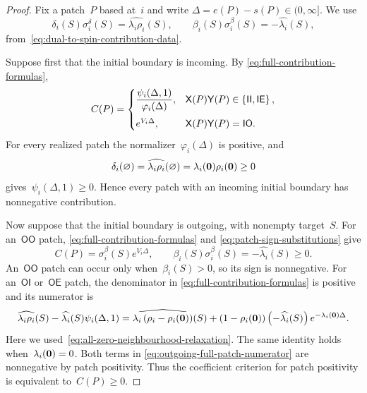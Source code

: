 \documentclass[EJP,preprint,NODS,nobera]{ejpecp}
\begin{document}
\begin{proof}
Fix a patch~$P$ based at~$i$ and write
$\Delta=e(P)-s(P)\in(0,\infty]$. We use
\begin{equation}
\label{eq:patch-sign-substitutions}
\delta_i(S)\sigma_i^\delta(S)
=
\widehat{\lambda_i\rho_i}(S),
\qquad
\beta_i(S)\sigma_i^\beta(S)
=
-\widehat{\lambda_i}(S),
\end{equation}
from~\eqref{eq:dual-to-spin-contribution-data}.

Suppose first that the initial boundary is incoming. By
\eqref{eq:full-contribution-formulas},
\begin{equation*}
C(P)
=
\begin{cases}
\displaystyle
\frac{\psi_i(\Delta,1)}{\varphi_i(\Delta)},
&\mathsf X(P)\mathsf Y(P)\in\left\{\mathsf{II},\mathsf{IE}\right\},
\\[1em]
e^{V_i\Delta},
&\mathsf X(P)\mathsf Y(P)=\mathsf{IO}.
\end{cases}
\end{equation*}
For every realized patch the normalizer~$\varphi_i(\Delta)$ is positive, and
\begin{equation*}
\delta_i(\varnothing)
=
\widehat{\lambda_i\rho_i}(\varnothing)
=
\lambda_i(\mathbf{0})\rho_i(\mathbf{0})
\geq0
\end{equation*}
gives~$\psi_i(\Delta,1)\geq0$. Hence every patch with an incoming
initial boundary has nonnegative contribution.

Now suppose that the initial boundary is outgoing, with nonempty target~$S$.
For an~$\mathsf{OO}$ patch,
\eqref{eq:full-contribution-formulas} and
\eqref{eq:patch-sign-substitutions} give
\begin{equation*}
C(P)
=
\sigma_i^\beta(S)e^{V_i\Delta},
\qquad
\beta_i(S)\sigma_i^\beta(S)
=
-\widehat{\lambda_i}(S)
\geq0.
\end{equation*}
An~$\mathsf{OO}$ patch can occur only when~$\beta_i(S)>0$, so its sign is
nonnegative. For an~$\mathsf{OI}$ or~$\mathsf{OE}$ patch, the denominator in
\eqref{eq:full-contribution-formulas} is positive and its numerator is
\begin{equation}
\widehat{\lambda_i\rho_i}(S)
-
\widehat{\lambda_i}(S)\psi_i(\Delta,1)
=
\widehat{\lambda_i\left(\rho_i-\rho_i(\mathbf{0})\right)}(S)
+
\left(1-\rho_i(\mathbf{0})\right)
\left(-\widehat{\lambda_i}(S)\right)
e^{-\lambda_i(\mathbf{0})\Delta}.
\label{eq:outgoing-full-patch-numerator}
\end{equation}
Here we used~\eqref{eq:all-zero-neighbourhood-relaxation}. The same identity
holds when~$\lambda_i(\mathbf{0})=0$. Both terms in
\eqref{eq:outgoing-full-patch-numerator} are nonnegative by patch positivity. Thus the coefficient criterion for patch positivity is equivalent to~$C(P)\geq 0$.


\end{proof}
\end{document}

